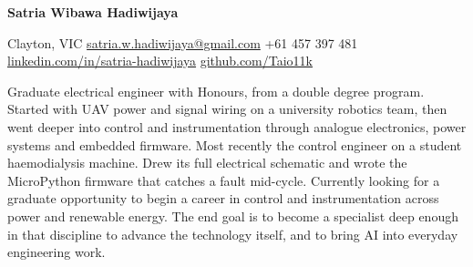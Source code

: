 \begin{center}
    {\Large \textbf{Satria Wibawa Hadiwijaya}\par}
    \vspace{0.25em}
    {\small Clayton, VIC
    \cvsep \href{mailto:satria.w.hadiwijaya@gmail.com}{satria.w.hadiwijaya@gmail.com}
    \cvsep +61 457 397 481
    \cvsep \href{https://www.linkedin.com/in/satria-hadiwijaya/}{linkedin.com/in/satria-hadiwijaya}
    \cvsep \href{https://github.com/Taio11k}{github.com/Taio11k}\par}
\end{center}

\vspace{0.4em}

\noindent
{\small
Graduate electrical engineer with Honours, from a double degree program. Started with UAV power and signal wiring on a university robotics team, then went deeper into control and instrumentation through analogue electronics, power systems and embedded firmware. Most recently the control engineer on a student haemodialysis machine. Drew its full electrical schematic and wrote the MicroPython firmware that catches a fault mid-cycle. Currently looking for a graduate opportunity to begin a career in control and instrumentation across power and renewable energy. The end goal is to become a specialist deep enough in that discipline to advance the technology itself, and to bring AI into everyday engineering work.
\par}

\vspace{0.2em}
